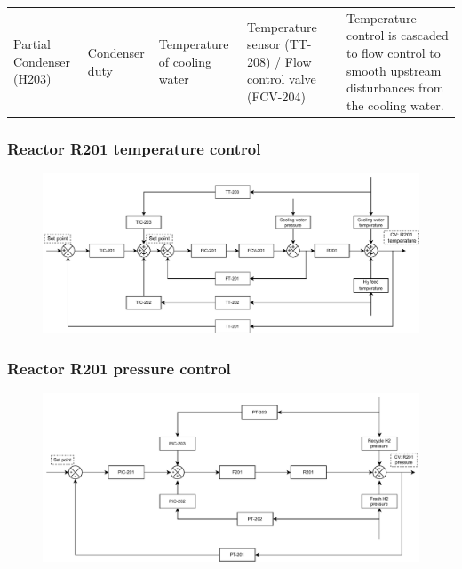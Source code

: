 \begin{table}[h]
{\begin{tabular}{p{3cm}|p{3cm}|p{4cm}|p{5cm}|p{6cm}}
                                            &                                             &                                                         &                                                                            &                                                                                                                                      \\ \midrule
Partial Condenser (H203)                    & Condenser duty                              & Temperature of cooling water                            & Temperature sensor (TT-208) / Flow control valve (FCV-204)                 & Temperature control is cascaded to flow control to smooth upstream   disturbances from the cooling water.                            \\ \bottomrule
\end{tabular}}
\end{table}


\subsubsection{Reactor R201 temperature control}
\begin{figure}[H]
    \centering
    \includegraphics[width=\linewidth]{chapters/4-operation-control/4-Figures/R201-TC.pdf}
    \caption{}
    \label{fig:R201-TC}
\end{figure}

\subsubsection{Reactor R201 pressure control}
\begin{figure}[H]
    \centering
    \includegraphics[width=\linewidth]{chapters/4-operation-control/4-Figures/R201-PC.pdf}
    \caption{}
    \label{fig:R201-PC}
\end{figure}

